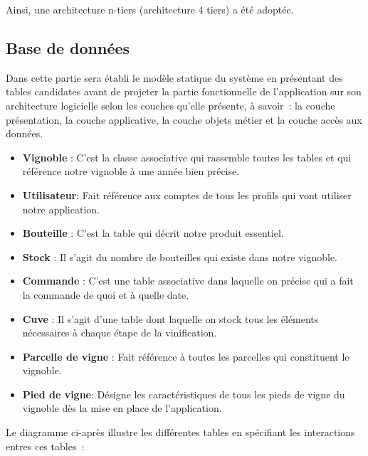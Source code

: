 \documentclass[a4paper, titlepage]{report}
\providecommand{\tightlist}{%
  \setlength{\itemsep}{0pt}\setlength{\parskip}{0pt}}
\begin{document}
Ainsi, une architecture n-tiers (architecture 4 tiers) a été adoptée.

\subsection{Base de données}

Dans cette partie sera établi le modèle statique du système en
présentant des tables candidates avant de projeter la partie
fonctionnelle de l'application sur son architecture logicielle selon les
couches qu'elle présente, à savoir~: la couche présentation, la couche
applicative, la couche objets métier et la couche accès aux données.

\begin{itemize}
\tightlist
\item \textbf{Vignoble} : C'est la classe associative qui rassemble toutes les tables et qui référence notre vignoble à une année bien précise.
\item \textbf{Utilisateur}: Fait référence aux comptes de tous les profils qui vont utiliser notre application.
\item \textbf{Bouteille} : C'est la table qui décrit notre produit essentiel. 
\item \textbf{Stock} : Il s'agit du nombre de bouteilles qui existe dans notre vignoble.
\item \textbf{Commande} : C'est une table associative dans laquelle on précise qui a fait la commande de quoi et à quelle date.
\item \textbf{Cuve} : Il s'agit d'une table dont laquelle on stock tous les éléments nécessaires à chaque étape de la vinification.
\item \textbf{Parcelle de vigne} : Fait référence à toutes les parcelles qui constituent le vignoble.
\item \textbf{Pied de vigne}: Désigne les caractéristiques de tous les pieds de vigne du vignoble dès la mise en place de l'application.
\end{itemize}

Le diagramme ci-après illustre les différentes tables en spécifiant les
interactions entres ces tables~:
\end{document}
